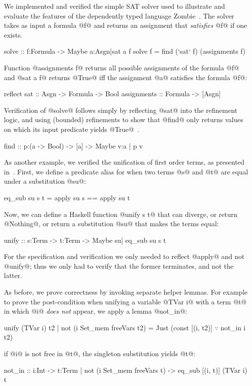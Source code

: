 %
We implemented and verified the simple
SAT solver used to illustrate and evaluate
the features of the dependently typed language
Zombie~\citep{Zombie}.
%
The solver takes as input a formula @f@
and returns an assignment that
\emph{satisfies} @f@ if one exists.
%
\begin{code}
solve :: f:Formula -> Maybe {a:Asgn|sat a f}
solve f = find (`sat` f) (assignments f)
\end{code}
%
Function @assignments f@ returns all possible
assignments of the formula @f@ and @sat a f@
returns @True@ iff the assignment @a@ satisfies
the formula @f@:
%
\begin{code}
  reflect sat :: Asgn -> Formula -> Bool
  assignments :: Formula -> [Asgn]
\end{code}
%
Verification of @solve@ follows simply by
reflecting @sat@ into the refinement logic,
and using (bounded) refinements to show
that @find@ only returns values on which
its input predicate yields @True@~\cite{Vazou15}.
%
\begin{code}
  find :: p:(a -> Bool) -> [a]
       -> Maybe {v:a | p v}
\end{code}


%
As another example, we verified the
unification of first order terms, as
presented in~\citep{Sjoberg2015}.
%
First, we define a predicate alias for
when two terms @s@ and @t@ are equal
under a substitution @su@:
%
\begin{code}
  eq_sub su s t = apply su s == apply su t
\end{code}
%
Now, we can define a Haskell function
@unify s t@ that can diverge, or return
@Nothing@, or return a substitution @su@
that makes the terms equal:
%
\begin{code}
  unify :: s:Term -> t:Term
        -> Maybe {su| eq_sub su s t}
\end{code}
%
For the specification and verification
we only needed to reflect @apply@ and
not @unify@; thus we only had to verify
that the former terminates, and not the latter.
%

%
As before, we prove correctness by invoking
separate helper lemmas.
%
For example to prove the post-condition
when unifying a variable @TVar i@ with
a term @t@ in which @i@ \emph{does not}
appear, we apply a lemma @not_in@:
%
\begin{mcode}
  unify (TVar i) t2
    | not (i Set_mem freeVars t2)
    = Just (const [(i, t2)] $\because$ not_in i t2)

\end{mcode}
\ie if @i@ is not free in @t@,
the singleton substitution yields @t@:
%
\begin{code}
  not_in :: i:Int
         -> t:{Term | not (i Set_mem freeVars t)}
         -> {eq_sub [(i, t)] (TVar i) t}
\end{code}
